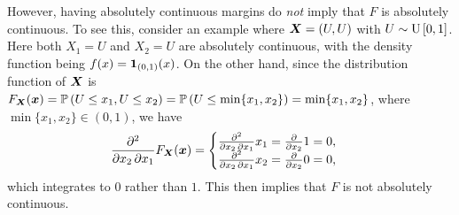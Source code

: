 \begin{enumerate}
However, having absolutely continuous margins do \emph{not} imply that \(F\) is
absolutely continuous. To see this, consider an example where
\(\bm{X}=(U,U)\) with \(U\sim \operatorname{U}\left[0,1\right]\). Here both \(X_1=U\) and
\(X_2=U\) are absolutely continuous, with the density function being
\(f(x)=\mathbf{1}_{(0,1)}(x)\). On the other hand, since the distribution function
of \(\bm{X}\) is \(F_{\bm{X}}(\bm{x})=\mathbb{P}\left(U\le x_1, U\le
x_2\right)=\mathbb{P}\left(U\le\min\{x_1,x_2\}\right)=\min\{x_1,x_2\}\), where \(\min\{x_1,x_2\}\in
(0,1)\), we have
\[
\pdv{}{x_2,x_1}F_{\bm{X}}(\bm{x})=
\begin{cases}
\pdv{}{x_2,x_1}x_1=\pdv{}{x_2}1=0, \\
\pdv{}{x_2,x_1}x_2=\pdv{}{x_2}0=0, \\
\end{cases}
\]
which integrates to \(0\) rather than \(1\). This then implies that \(F\) is
not absolutely continuous.
\end{enumerate}
